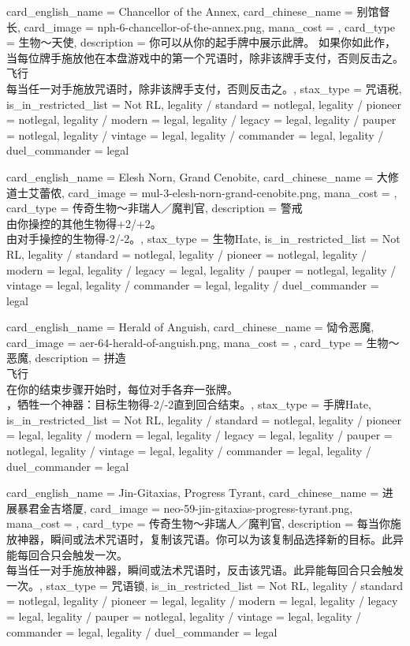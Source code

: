 \documentclass[lang = cn, color = black, 10pt]{AllThatStax}
\begin{document}
\card
{
	card_english_name = {Chancellor of the Annex},
	card_chinese_name = {别馆督长},
	card_image = nph-6-chancellor-of-the-annex.png,
	mana_cost = ,
	card_type = 生物～天使,
	description = {你可以从你的起手牌中展示此牌。 如果你如此作，当每位牌手施放他在本盘游戏中的第一个咒语时，除非该牌手支付，否则反击之。\\
飞行\\
每当任一对手施放咒语时，除非该牌手支付，否则反击之。},
	stax_type = 咒语税,
	is_in_restricted_list = Not RL,
	legality / standard = notlegal,
	legality / pioneer = notlegal,
	legality / modern = legal,
	legality / legacy = legal,
	legality / pauper = notlegal,
	legality / vintage = legal,
	legality / commander = legal,
	legality / duel_commander = legal
}

\card
{
	card_english_name = {Elesh Norn, Grand Cenobite},
	card_chinese_name = {大修道士艾蕾侬},
	card_image = mul-3-elesh-norn-grand-cenobite.png,
	mana_cost = ,
	card_type = 传奇生物～非瑞人／魔判官,
	description = {警戒\\
由你操控的其他生物得+2/+2。\\
由对手操控的生物得-2/-2。},
	stax_type = 生物Hate,
	is_in_restricted_list = Not RL,
	legality / standard = notlegal,
	legality / pioneer = notlegal,
	legality / modern = legal,
	legality / legacy = legal,
	legality / pauper = notlegal,
	legality / vintage = legal,
	legality / commander = legal,
	legality / duel_commander = legal
}

\card
{
	card_english_name = {Herald of Anguish},
	card_chinese_name = {恸令恶魔},
	card_image = aer-64-herald-of-anguish.png,
	mana_cost = ,
	card_type = 生物～恶魔,
	description = {拼造\\
飞行\\
在你的结束步骤开始时，每位对手各弃一张牌。\\
，牺牲一个神器：目标生物得-2/-2直到回合结束。},
	stax_type = 手牌Hate,
	is_in_restricted_list = Not RL,
	legality / standard = notlegal,
	legality / pioneer = legal,
	legality / modern = legal,
	legality / legacy = legal,
	legality / pauper = notlegal,
	legality / vintage = legal,
	legality / commander = legal,
	legality / duel_commander = legal
}

\card
{
	card_english_name = {Jin-Gitaxias, Progress Tyrant},
	card_chinese_name = {进展暴君金吉塔厦},
	card_image = neo-59-jin-gitaxias-progress-tyrant.png,
	mana_cost = ,
	card_type = 传奇生物～非瑞人／魔判官,
	description = {每当你施放神器，瞬间或法术咒语时，复制该咒语。你可以为该复制品选择新的目标。此异能每回合只会触发一次。\\
每当任一对手施放神器，瞬间或法术咒语时，反击该咒语。此异能每回合只会触发一次。},
	stax_type = 咒语锁,
	is_in_restricted_list = Not RL,
	legality / standard = notlegal,
	legality / pioneer = legal,
	legality / modern = legal,
	legality / legacy = legal,
	legality / pauper = notlegal,
	legality / vintage = legal,
	legality / commander = legal,
	legality / duel_commander = legal
}
\end{document}
